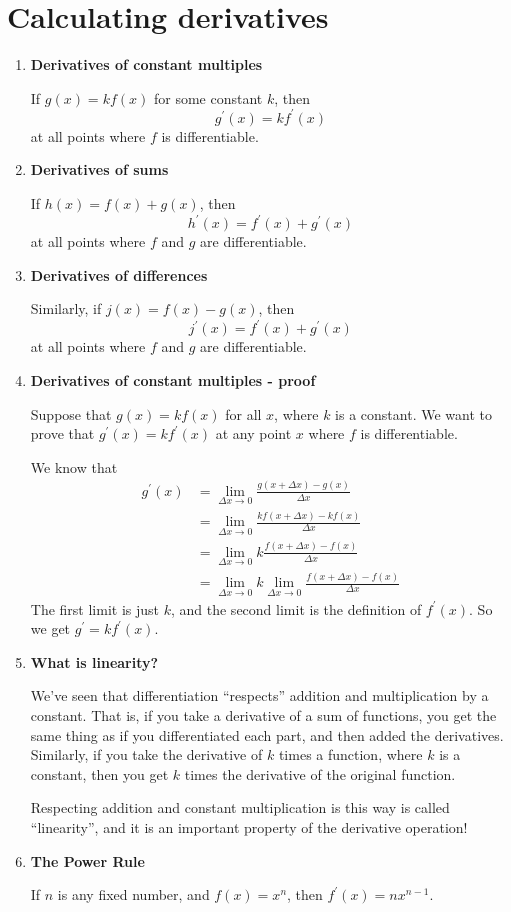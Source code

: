 \section{Calculating derivatives}
\begin{enumerate}
    \item \textbf{Derivatives of constant multiples}

        If $g(x)=kf(x)$ for some constant $k$, then
        $$
        g^\prime(x)=kf^\prime(x)
        $$
        at all points where $f$ is differentiable.
    \item \textbf{Derivatives of sums}

        If $h(x)=f(x)+g(x)$, then
        $$
        h^\prime(x)=f^\prime(x)+g^\prime(x)
        $$
        at all points where $f$ and $g$ are differentiable.
    \item \textbf{Derivatives of differences}

        Similarly, if $j(x)=f(x)-g(x)$, then
        $$
        j^\prime(x)=f^\prime(x)+g^\prime(x)
        $$
        at all points where $f$ and $g$ are differentiable.
    \item \textbf{Derivatives of constant multiples - proof}

        Suppose that $g(x)=kf(x)$ for all $x$, where $k$ is a constant. We want to prove that $g^\prime(x)=kf^\prime(x)$ at any point $x$ where $f$ is differentiable.

        We know that
        \begin{align*}
            g^\prime(x) & =\lim_{\Delta x\to 0} \frac{g(x+\Delta x)-g(x)}{\Delta x} \\
                        & =\lim_{\Delta x\to 0} \frac{kf(x+\Delta x)-kf(x)}{\Delta x} \\
                        & =\lim_{\Delta x\to 0} k\frac{f(x+\Delta x)-f(x)}{\Delta x} \\
                        & =\lim_{\Delta x\to 0} k \lim_{\Delta x\to 0} \frac{f(x+\Delta x)-f(x)}{\Delta x}
        \end{align*}
        The first limit is just $k$, and the second limit is the definition of $f^\prime(x)$. So we get $g^\prime=kf^\prime(x)$.
    \item \textbf{What is linearity?}

        We've seen that differentiation ``respects'' addition and multiplication by a constant. That is, if you take a derivative of a sum of functions, you get the same thing as if you differentiated each part, and then added the derivatives. Similarly, if you take the derivative of $k$ times a function, where $k$ is a constant, then you get $k$ times the derivative of the original function.

        Respecting addition and constant multiplication is this way is called ``linearity'', and it is an important property of the derivative operation!
    \item \textbf{The Power Rule}

        If $n$ is any fixed number, and $f(x)=x^n$, then $f^\prime(x)=nx^{n-1}$.
\end{enumerate}


